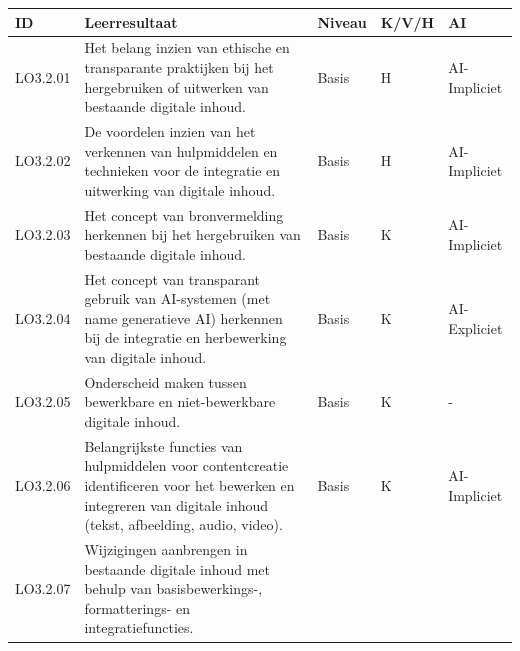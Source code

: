 \documentclass[
  dutch,
  letterpaper,
  DIV=11,
  numbers=noendperiod]{scrartcl}
\begin{document}
\begin{longtable}[]{@{}
  >{\centering\arraybackslash}p{}
  >{\centering\arraybackslash}p{}
  >{\centering\arraybackslash}p{}
  >{\centering\arraybackslash}p{}
  >{\centering\arraybackslash}p{}@{}}
\toprule\noalign{}
\begin{minipage}[b]{\linewidth}\centering
ID
\end{minipage} & \begin{minipage}[b]{\linewidth}\centering
Leerresultaat
\end{minipage} & \begin{minipage}[b]{\linewidth}\centering
Niveau
\end{minipage} & \begin{minipage}[b]{\linewidth}\centering
K/V/H
\end{minipage} & \begin{minipage}[b]{\linewidth}\centering
AI
\end{minipage} \\
\midrule\noalign{}
\endhead
\bottomrule\noalign{}
\endlastfoot
LO3.2.01 & Het belang inzien van ethische en transparante praktijken bij
het hergebruiken of uitwerken van bestaande digitale inhoud. & Basis & H
& AI-Impliciet \\
LO3.2.02 & De voordelen inzien van het verkennen van hulpmiddelen en
technieken voor de integratie en uitwerking van digitale inhoud. & Basis
& H & AI-Impliciet \\
LO3.2.03 & Het concept van bronvermelding herkennen bij het hergebruiken
van bestaande digitale inhoud. & Basis & K & AI-Impliciet \\
LO3.2.04 & Het concept van transparant gebruik van AI-systemen (met name
generatieve AI) herkennen bij de integratie en herbewerking van digitale
inhoud. & Basis & K & AI-Expliciet \\
LO3.2.05 & Onderscheid maken tussen bewerkbare en niet-bewerkbare
digitale inhoud. & Basis & K & - \\
LO3.2.06 & Belangrijkste functies van hulpmiddelen voor contentcreatie
identificeren voor het bewerken en integreren van digitale inhoud
(tekst, afbeelding, audio, video). & Basis & K & AI-Impliciet \\
LO3.2.07 & Wijzigingen aanbrengen in bestaande digitale inhoud met
behulp van basisbewerkings-, formatterings- en integratiefuncties. &

\end{longtable}
\end{document}
